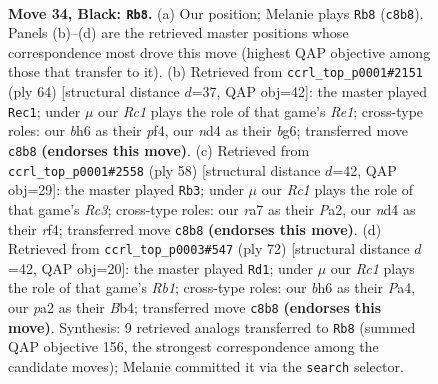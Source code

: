 \documentclass[11pt]{article}
\begin{document}
\clearpage

\begin{figure}[p]\centering
\begin{subfigure}{0.46\textwidth}\centering
\resizebox{\linewidth}{!}{%
\newchessgame
\chessboard[
  setfen={2r3k1/R6p/2p2ppB/8/3N1P1P/3P4/PPP2PK1/8 b - - 2 34},
  showmover=false,
  pgfstyle=straightmove, color=movearrow, markmove={c8-b8}
]}
\caption{}
\end{subfigure}\hfill
\begin{subfigure}{0.46\textwidth}\centering
\resizebox{\linewidth}{!}{%
\newchessgame
\chessboard[
  setfen={3r2k1/2R2pp1/6bp/3P2n1/pP2Pp2/3P4/P7/4R1K1 w - - 1 33},
  showmover=false,
  pgfstyle=straightmove, color=movearrow, markmove={e1-c1}
]}
\caption{}
\end{subfigure}
\\[4pt]
\begin{subfigure}{0.46\textwidth}\centering
\resizebox{\linewidth}{!}{%
\newchessgame
\chessboard[
  setfen={6k1/5pp1/1pp3p1/6P1/2P2r2/2R4P/P4P2/6K1 w - - 0 30},
  showmover=false,
  pgfstyle=straightmove, color=movearrow, markmove={c3-b3}
]}
\caption{}
\end{subfigure}\hfill
\begin{subfigure}{0.46\textwidth}\centering
\resizebox{\linewidth}{!}{%
\newchessgame
\chessboard[
  setfen={6k1/1b3p2/p5p1/7p/PB1p3P/1P3P2/2r3P1/1R4K1 w - - 0 37},
  showmover=false,
  pgfstyle=straightmove, color=movearrow, markmove={b1-d1}
]}
\caption{}
\end{subfigure}
\caption{\textbf{Move 34, Black: \texttt{Rb8}.} (a) Our position; Melanie plays \texttt{Rb8} (\texttt{c8b8}). Panels (b)--(d) are the retrieved master positions whose correspondence most drove this move (highest QAP objective among those that transfer to it). (b) Retrieved from \texttt{ccrl\_top\_p0001\#2151} (ply 64) [structural distance $d$=37, QAP obj=42]: the master played \texttt{Rec1}; under $\mu$ our \emph{Rc1} plays the role of that game's \emph{Re1}; cross-type roles: our \emph{b}h6 as their \emph{p}f4, our \emph{n}d4 as their \emph{b}g6; transferred move \texttt{c8b8} \textbf{(endorses this move)}. (c) Retrieved from \texttt{ccrl\_top\_p0001\#2558} (ply 58) [structural distance $d$=42, QAP obj=29]: the master played \texttt{Rb3}; under $\mu$ our \emph{Rc1} plays the role of that game's \emph{Rc3}; cross-type roles: our \emph{r}a7 as their \emph{P}a2, our \emph{n}d4 as their \emph{r}f4; transferred move \texttt{c8b8} \textbf{(endorses this move)}. (d) Retrieved from \texttt{ccrl\_top\_p0003\#547} (ply 72) [structural distance $d$=42, QAP obj=20]: the master played \texttt{Rd1}; under $\mu$ our \emph{Rc1} plays the role of that game's \emph{Rb1}; cross-type roles: our \emph{b}h6 as their \emph{P}a4, our \emph{p}a2 as their \emph{B}b4; transferred move \texttt{c8b8} \textbf{(endorses this move)}. Synthesis: 9 retrieved analogs transferred to \texttt{Rb8} (summed QAP objective 156, the strongest correspondence among the candidate moves); Melanie committed it via the \texttt{search} selector.}
\label{fig:thought-m67}
\end{figure}
\end{document}
